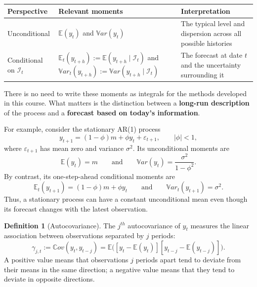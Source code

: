 \documentclass[
  11pt,
]{book}
\theoremstyle{definition}
\newtheorem{definition}{Definition}[chapter]
\theoremstyle{definition}
\theoremstyle{definition}
\theoremstyle{definition}
\theoremstyle{remark}
\begin{document}
\begin{longtable}[]{@{}
  >{\raggedright\arraybackslash}p{}
  >{\raggedright\arraybackslash}p{}
  >{\raggedright\arraybackslash}p{}@{}}
\toprule\noalign{}
\begin{minipage}[b]{\linewidth}\raggedright
Perspective
\end{minipage} & \begin{minipage}[b]{\linewidth}\raggedright
Relevant moments
\end{minipage} & \begin{minipage}[b]{\linewidth}\raggedright
Interpretation
\end{minipage} \\
\midrule\noalign{}
\endhead
\bottomrule\noalign{}
\endlastfoot
Unconditional & \(\mathbb{E}(y_t)\) and \(\mathbb{V}ar(y_t)\) & The typical level and dispersion across all possible histories \\
Conditional on \(\mathcal{I}_t\) & \(\mathbb{E}_t(y_{t+h}) := \mathbb{E}(y_{t+h}\mid\mathcal{I}_t)\) and \(\mathbb{V}ar_t(y_{t+h}) := \mathbb{V}ar(y_{t+h}\mid\mathcal{I}_t)\) & The forecast at date \(t\) and the uncertainty surrounding it \\
\end{longtable}

There is no need to write these moments as integrals for the methods developed in this course. What matters is the distinction between a \textbf{long-run description} of the process and a \textbf{forecast based on today's information}.

For example, consider the stationary AR(1) process
\[
y_{t+1}=(1-\phi)m+\phi y_t+\varepsilon_{t+1},
\qquad |\phi|<1,
\]
where \(\varepsilon_{t+1}\) has mean zero and variance \(\sigma^2\). Its unconditional moments are
\[
\mathbb{E}(y_t)=m
\qquad\mbox{and}\qquad
\mathbb{V}ar(y_t)=\frac{\sigma^2}{1-\phi^2}.
\]
By contrast, its one-step-ahead conditional moments are
\[
\mathbb{E}_t(y_{t+1})=(1-\phi)m+\phi y_t
\qquad\mbox{and}\qquad
\mathbb{V}ar_t(y_{t+1})=\sigma^2.
\]
Thus, a stationary process can have a constant unconditional mean even though its forecast changes with the latest observation.

\begin{definition}[Autocovariance]
\protect\hypertarget{def:autocov}{}\label{def:autocov}The \(j^{th}\) autocovariance of \(y_t\) measures the linear association between observations separated by \(j\) periods:
\[
\gamma_{j,t} := \mathbb{C}ov(y_t,y_{t-j})
= \mathbb{E}\bigl([y_t-\mathbb{E}(y_t)][y_{t-j}-\mathbb{E}(y_{t-j})]\bigr).
\]
A positive value means that observations \(j\) periods apart tend to deviate from their means in the same direction; a negative value means that they tend to deviate in opposite directions.
\end{definition}
\end{document}
